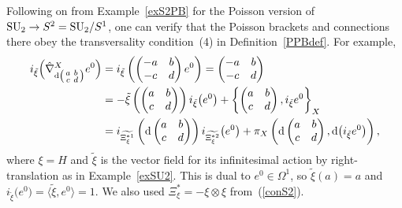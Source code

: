 \documentclass[10pt,a4paper]{amsart}
\numberwithin{equation}{section}
\newcommand{\<}{{\langle}}
\renewcommand{\>}{{\rangle}}
\newcommand{\tens}{\otimes}
\newcommand{\extd}{{\rm d}}
\begin{document}
\begin{Example}\label{exspherebun} Following on from Example~\ref{exS2PB} for the Poisson version of ${\rm SU}_2\to S^2={\rm SU}_2/S^1$, one can verify that the Poisson brackets and connections there obey the transversality condition~(4) in Definition~\ref{PPBdef}. For example,
\begin{align*}
i_{\tilde\xi}\Big(\hat\nabla^X_{\extd \left(\begin{smallmatrix} a & b \\ c & d\end{smallmatrix}\right)}e^0\Big)&=i_{\tilde\xi}\left( \begin{pmatrix} -a & b \\ -c & d\end{pmatrix}e^0\right)= \begin{pmatrix} -a & b \\ -c & d\end{pmatrix}\\
&=-\tilde{\xi}\left( \begin{pmatrix} a & b \\ c & d\end{pmatrix}\right)i_{\tilde\xi}\big(e^0\big)+\left\{ \begin{pmatrix} a & b \\ c & d\end{pmatrix},i_{\tilde\xi}e^0\right\}_X\\
&=i_{\widetilde{\Xi_\xi^{*1}}}\left(\extd \begin{pmatrix} a & b \\ c & d\end{pmatrix}\right)i_{\widetilde{\Xi_\xi^{*2}}}\big(e^0\big)+\pi_X\left(\extd \begin{pmatrix} a & b \\ c & d\end{pmatrix},\extd\big(i_{\tilde\xi}e^0\big)\right),\end{align*}
where $\xi=H$ and $\tilde\xi$ is the vector field for its infinitesimal action by right-translation as in Example~\ref{exSU2}. This is dual to $e^0\in\Omega^1$, so $\tilde\xi(a)=a$ and $i_{\tilde\xi}\big(e^0\big)=\big\langle \tilde\xi,e^0\big\rangle=1$. We also used $\Xi_\xi^*=-\xi\tens\xi$ from~(\ref{conS2}).


\end{Example}
\end{document}
